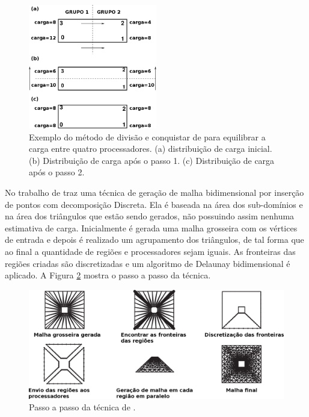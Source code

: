  \begin{figure}[htbp]
     \centering
     \includegraphics[width=0.5\textwidth]{fig/vidwans.png}
     \caption{Exemplo do método de divisão e conquistar de \cite{bib:VIDWANS94} para equilibrar a carga entre quatro processadores. (a) distribuição de carga inicial. (b) Distribuição de carga após o passo 1. (c) Distribuição de carga após o passo 2.}
     \label{fig:vidwans}
 \end{figure} 

 
No trabalho de \cite{bib:GAITHER96} traz uma técnica de geração de malha bidimensional por inserção de pontos com decomposição Discreta. Ela é baseada na área dos sub-domínios e na área dos triângulos que estão sendo gerados, não possuindo assim nenhuma estimativa de carga. Inicialmente é gerada uma malha grosseira com os vértices de entrada e depois é realizado um agrupamento dos triângulos, de tal forma que ao final a quantidade de regiões e processadores sejam iguais. As fronteiras das regiões criadas são discretizadas e um algoritmo de Delaunay bidimensional é aplicado. A Figura \ref{fig:gaither} mostra o passo a passo da técnica.

 
 \begin{figure}[htbp]
     \centering
     \includegraphics[width=1.0\textwidth]{fig/gaither.png}
     \caption{Passo a passo da técnica de \cite{bib:GAITHER96}.}
     \label{fig:gaither}
 \end{figure} 

